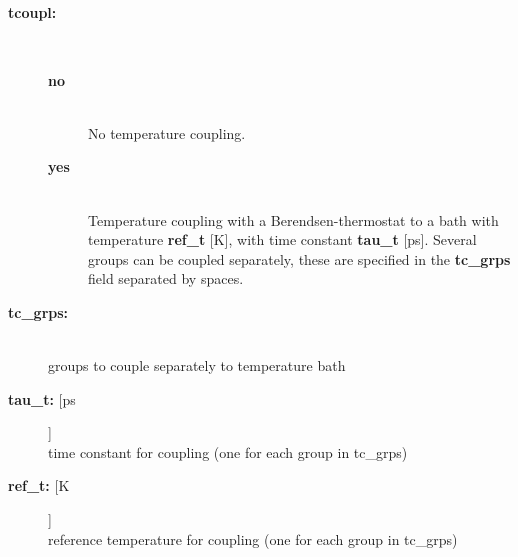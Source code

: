\subsection{}
\begin{description}
\item[{\bf tcoupl:}]\mbox{}\\
\vspace{-2ex}\begin{description}
\item[{\bf no}]\mbox{}\\
No temperature coupling. 
\item[{\bf yes}]\mbox{}\\
Temperature coupling with a Berendsen-thermostat to a bath with
temperature {\bf ref\_t} [K], with time constant {\bf tau\_t} [ps].
Several groups can be coupled separately, these are specified in the
{\bf tc\_grps} field separated by spaces.
\end{description}
\item[{\bf tc\_grps:}]\mbox{}\\
groups to couple separately to temperature bath
\item[{\bf tau\_t: }[ps]]\mbox{}\\
time constant for coupling (one for each group in tc\_grps)
\item[{\bf ref\_t: }[K]]\mbox{}\\
reference temperature for coupling (one for each group in tc\_grps)
\end{description}

